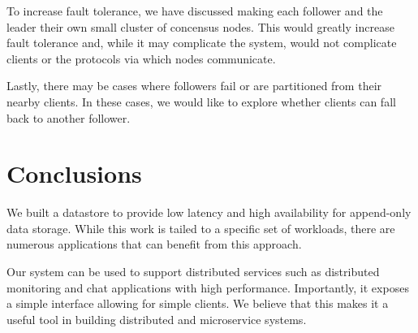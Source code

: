 \documentclass[11pt,english,twocolumn]{article}
\begin{document}
To increase fault tolerance, we have discussed making each follower and the
leader their own small cluster of concensus nodes. This would greatly increase
fault tolerance and, while it may complicate the system, would not complicate
clients or the protocols via which nodes communicate.

Lastly, there may be cases where followers fail or are partitioned from their
nearby clients. In these cases, we would like to explore whether clients can
fall back to another follower.

\section{Conclusions}
We built a datastore to provide low latency and high availability for append-only
data storage. While this work is tailed to a specific set of workloads, there
are numerous applications that can benefit from this approach.

Our system can be used to support distributed services such as distributed
monitoring and chat applications with high performance. Importantly, it exposes
a simple interface allowing for simple clients. We believe that this makes it a
useful tool in building distributed and microservice systems.

 

\end{document}
